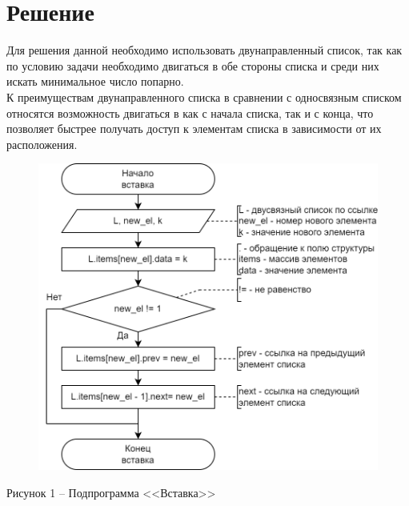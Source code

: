 \documentclass[a4paper,14pt]{extarticle}
\begin{document}
  \section*{Решение}
  Для решения данной необходимо использовать двунаправленный список, так как по условию задачи необходимо двигаться в обе стороны списка и среди них искать минимальное число попарно.\\
  \indent К преимуществам двунаправленного списка в сравнении с односвязным списком относятся возможность двигаться в как с начала списка, так и с конца, что позволяет быстрее получать доступ к элементам списка в зависимости от их расположения.\\

  \begin{figure}[h]
    \centering
    \includegraphics[width=0.56\linewidth]{images/s-1}
  \end{figure}
  \begin{center}
    Рисунок 1 – Подпрограмма <<Вставка>>
  \end{center}
\end{document}
